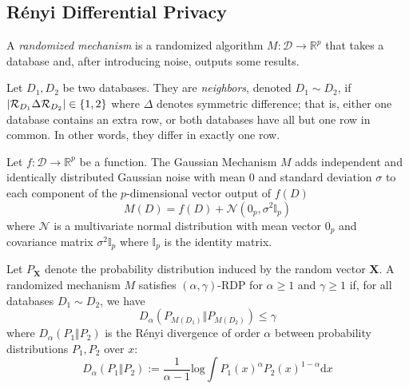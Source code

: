 \documentclass[manuscript,screen,review,anonymous]{acmart}
\DeclarePairedDelimiter{\set}{\{}{\}}
\DeclarePairedDelimiter{\abs}{\lvert}{\rvert}
\renewcommand{\implies}{\rightarrow}
\newcommand{\db}{D}
\newcommand{\dbs}{\mathcal{D}}
\newcommand{\prob}[1]{\text{Pr}[#1]}
\begin{document}
\subsection{R\'enyi Differential Privacy}


A \emph{randomized mechanism} is a randomized algorithm $M : \dbs \implies \mathbb{R}^p$ that takes a database and, after introducing noise, outputs some results.

Let $\db_1,\db_2$ be two databases. They are \emph{neighbors}, denoted $\db_1 \sim \db_2$, if $\abs{\mathcal{R}_{\db_1} \Delta \mathcal{R}_{\db_2}} \in \set{1,2}$ where $\Delta$ denotes symmetric difference; that is, either one database contains an extra row, or both databases have all but one row in common. In other words, they differ in exactly one row.

\begin{definition}\label{def:gm}
Let $f : \dbs \implies \mathbb{R}^p$ be a function. The Gaussian Mechanism $M$ adds independent and identically distributed Gaussian noise with mean $0$ and standard deviation $\sigma$ to each component of the $p$-dimensional vector output of $f(\db)$
\[
M(\db) = f(\db) + \mathcal{N}(0_p, \sigma^2 \mathbb{I}_p)
\]
where $\mathcal{N}$ is a multivariate normal distribution with mean vector $0_p$ and covariance matrix $\sigma^2 \mathbb{I}_p$ where $\mathbb{I}_p$ is the identity matrix.
\end{definition}

\begin{definition}\label{def:rdp}
Let $P_{\mathbf{X}}$ denote the probability distribution induced by the random vector $\mathbf{X}$. A randomized mechanism $M$ satisfies $(\alpha,\gamma)$-RDP for $\alpha \geq 1$ and $\gamma \geq 1$ if, for all databases $\db_1 \sim \db_2$, we have
\[
D_\alpha(P_{M(\db_1)} \Vert P_{M(\db_2)}) \leq \gamma
\]
where $D_\alpha(P_1 \Vert P_2)$ is the R\'enyi divergence\cite{van2014renyi,van2010renyi,li2016renyi} of order $\alpha$ between probability distributions $P_1,P_2$ over $x$:
\[
D_\alpha(P_1 \Vert P_2) := \frac{1}{\alpha - 1} \text{log} \int {P_1(x)}^\alpha {P_2(x)}^{1-\alpha} \text{d}x
\]
\end{definition}
\end{document}
